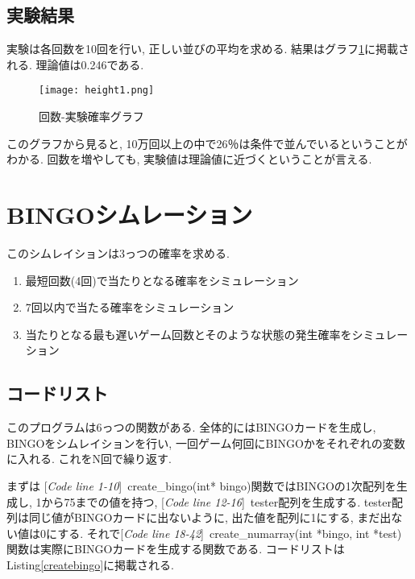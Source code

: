 \documentclass[a4j, titlepage]{jarticle}
\begin{document}
\subsection{実験結果}
実験は各回数を10回を行い, 正しい並びの平均を求める. 結果はグラフ\ref{graph:height1}に掲載される. 理論値は0.246である.
\begin{figure}[tbh]
    \centering \texttt{[image: height1.png]}
    \caption{回数-実験確率グラフ}
    \label{graph:height1}
\end{figure}
このグラフから見ると, 10万回以上の中で26％は条件で並んでいるということがわかる.
回数を増やしても, 実験値は理論値に近づくということが言える. 

\section{BINGOシムレーション}
このシムレイションは3っつの確率を求める.
\begin{enumerate}
    \item 最短回数(4回)で当たりとなる確率をシミュレーション
    \item 7回以内で当たる確率をシミュレーション
    \item 当たりとなる最も遅いゲーム回数とそのような状態の発生確率をシミュレーション
\end{enumerate}

\subsection{コードリスト}
このプログラムは6っつの関数がある. 全体的にはBINGOカードを生成し, BINGOをシムレイションを行い, 一回ゲーム何回にBINGOかをそれぞれの変数に入れる. これをN回で繰り返す. 

まずは [\textit{Code line 1-10}]~create\_bingo(int* bingo)関数ではBINGOの1次配列を生成し, 1から75までの値を持つ, [\textit{Code line 12-16}]~tester配列を生成する. tester配列は同じ値がBINGOカードに出ないように, 出た値を配列に1にする, まだ出ない値は0にする. それで[\textit{Code line 18-42}]~create\_numarray(int *bingo, int *test)関数は実際にBINGOカードを生成する関数である. コードリストは Listing\ref{createbingo}に掲載される.
\end{document}

